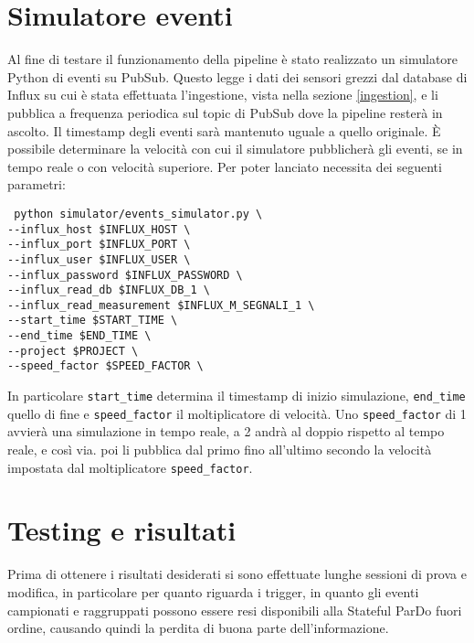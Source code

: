 \section{Simulatore eventi}
Al fine di testare il funzionamento della pipeline è stato realizzato un simulatore Python di eventi su PubSub. Questo legge i dati dei sensori grezzi dal database di Influx su cui è stata effettuata l'ingestione, vista nella sezione \ref{ingestion}, e li pubblica a frequenza periodica sul topic di PubSub dove la pipeline resterà in ascolto. Il timestamp degli eventi sarà mantenuto uguale a quello originale. È possibile determinare la velocità con cui il simulatore pubblicherà gli eventi, se in tempo reale o con velocità superiore. Per poter lanciato necessita dei seguenti parametri:
\lstset{language=bash}
\begin{lstlisting}
 python simulator/events_simulator.py \
--influx_host $INFLUX_HOST \
--influx_port $INFLUX_PORT \
--influx_user $INFLUX_USER \
--influx_password $INFLUX_PASSWORD \
--influx_read_db $INFLUX_DB_1 \
--influx_read_measurement $INFLUX_M_SEGNALI_1 \
--start_time $START_TIME \
--end_time $END_TIME \
--project $PROJECT \
--speed_factor $SPEED_FACTOR \
\end{lstlisting}
In particolare \texttt{start\_time} determina il timestamp di inizio simulazione, \texttt{end\_time} quello di fine e \texttt{speed\_factor} il moltiplicatore di velocità. Uno \texttt{speed\_factor} di 1 avvierà una simulazione in tempo reale, a 2 andrà al doppio rispetto al tempo reale, e così via.
poi li pubblica dal primo fino all'ultimo secondo la velocità impostata dal moltiplicatore \texttt{speed\_factor}.
\section{Testing e risultati}\label{testerisultati}
Prima di ottenere i risultati desiderati si sono effettuate lunghe sessioni di prova e modifica, in particolare per quanto riguarda i trigger, in quanto gli eventi campionati e raggruppati possono essere resi disponibili alla Stateful ParDo fuori ordine, causando quindi la perdita di buona parte dell'informazione.
